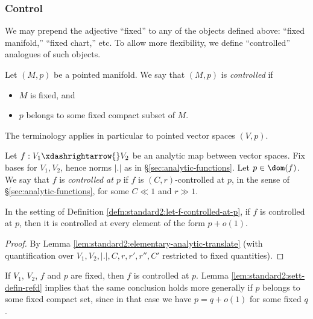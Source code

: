 \subsubsection{Control}\label{sec:control}
We may prepend the adjective ``fixed'' to any of the objects defined above: ``fixed manifold,'' ``fixed chart,'' etc.  To allow more flexibility, we define ``controlled'' analogues of such objects.

\begin{definition}\label{defn:standard2:emphc-point-manif}
  Let $(M,p)$ be a pointed manifold.  We say that $(M,p)$ is \emph{controlled} if
  \begin{itemize}
  \item $M$ is fixed, and
  \item $p$ belongs to some fixed compact subset of $M$.
  \end{itemize}
\end{definition}
The terminology applies in particular to pointed vector spaces $(V,p)$.

\begin{definition}\label{defn:standard2:let-f-controlled-at-p}
  Let $f : V_1 \xdashrightarrow{} V_2$ be an analytic map between vector spaces.  Fix bases for $V_1, V_2$, hence norms $|.|$ as in \S\ref{sec:analytic-functions}.  Let $p \in \dom(f)$.  We say that $f$ is \emph{controlled at $p$} if $f$ is $(C,r)$-controlled at $p$, in the sense of \S\ref{sec:analytic-functions}, for some $C \ll 1$ and $r \gg 1$.
\end{definition}

\begin{lemma}\label{lem:standard2:sett-defin-refd}
  In the setting of Definition \ref{defn:standard2:let-f-controlled-at-p}, if $f$ is controlled at $p$, then it is controlled at every element of the form $p + o(1)$.
\end{lemma}
\begin{proof}
  By Lemma \ref{lem:standard2:elementary-analytic-translate} (with quantification over $V_1, V_2, |.|, C, r, r', r'', C'$ restricted to fixed quantities).
\end{proof}

\begin{example}\label{example:standard2:if-v_1-v_2}
  If $V_1$, $V_2$, $f$ and $p$ are fixed, then $f$ is controlled at $p$.  Lemma \ref{lem:standard2:sett-defin-refd} implies that the same conclusion holds more generally if $p$ belongs to some fixed compact set, since in that case we have $p = q + o(1)$ for some fixed $q$.
\end{example}


